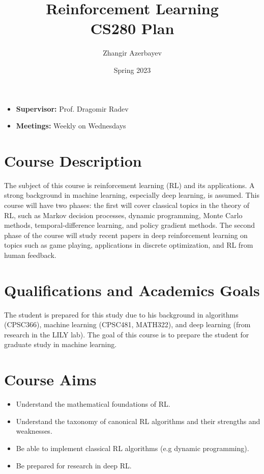 \documentclass{article}
\title{Reinforcement Learning\\\large CS280 Plan}
\author{Zhangir Azerbayev}
\date{Spring 2023}
\begin{document}
    \maketitle

    \begin{itemize}
        \item[]\textbf{Supervisor:} Prof. Dragomir Radev
        \item[]\textbf{Meetings: } Weekly on Wednesdays
    \end{itemize}

    \section{Course Description}
    The subject of this course is reinforcement learning (RL) and its applications. A strong background in machine learning, especially deep learning, is assumed. This course will have two phases: the first will cover classical topics in the theory of RL, such as Markov decision processes, dynamic programming, Monte Carlo methods, temporal-difference learning, and policy gradient methods. The second phase of the course will study recent papers in deep reinforcement learning on topics such as game playing, applications in discrete optimization, and RL from human feedback. 

    \section{Qualifications and Academics Goals}
    The student is prepared for this study due to his background in algorithms (CPSC366), machine learning (CPSC481, MATH322), and deep learning (from research in the LILY lab). The goal of this course is to prepare the student for graduate study in machine learning.  

\section{Course Aims}
\begin{itemize}
    \item Understand the mathematical foundations of RL. 
    \item Understand the taxonomy of canonical RL algorithms and their strengths and weaknesses. 
    \item Be able to implement classical RL algorithms (e.g dynamic programming). 
    \item Be prepared for research in deep RL. 
\end{itemize}
\end{document}
